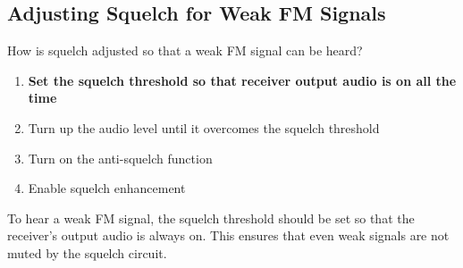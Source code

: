 \subsection{Adjusting Squelch for Weak FM Signals}
\label{T4B03}

\begin{tcolorbox}[colback=gray!10!white,colframe=black!75!black,title=T4B03]
How is squelch adjusted so that a weak FM signal can be heard?
\begin{enumerate}[noitemsep]
    \item \textbf{Set the squelch threshold so that receiver output audio is on all the time}
    \item Turn up the audio level until it overcomes the squelch threshold
    \item Turn on the anti-squelch function
    \item Enable squelch enhancement
\end{enumerate}
\end{tcolorbox}

To hear a weak FM signal, the squelch threshold should be set so that the receiver's output audio is always on. This ensures that even weak signals are not muted by the squelch circuit.